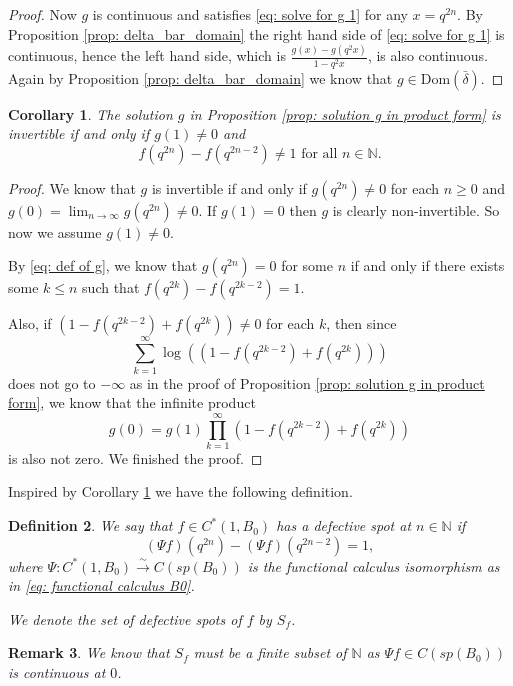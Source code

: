 \documentclass[12pt]{article}
\newtheorem{definition}{Definition}[section]
\newtheorem{remark}[definition]{Remark}
\newtheorem{corollary}[definition]{Corollary}
\numberwithin{equation}{section}
\def\Dom{{\mathrm {Dom}}}
\def\db{\bar{\delta}}
\def\N{{\mathbb N}}
\begin{document}
\begin{proof}
Now $g$ is continuous and satisfies \eqref{eq: solve for g 1} for any $x=q^{2n}$. By Proposition \ref{prop: delta_bar_domain} the right hand side of \eqref{eq: solve for g 1} is continuous, hence the left hand side, which is  $\frac{g(x) - g(q^2x)}{1 - q^2x}$, is also continuous. Again by Proposition \ref{prop: delta_bar_domain} we know that $g\in \Dom(\db)$.
\end{proof}

\begin{corollary}\label{coro: g invertible}
   The solution $g$ in Proposition \ref{prop: solution g in product form} is invertible if and only if $g(1)\neq 0$ and
    \begin{equation}\label{eq: defective spot of f}
    f(q^{2n}) - f(q^{2n - 2}) \neq 1\text{ for all }n \in \N.\end{equation}
\end{corollary}
\begin{proof}
We know that $g$ is invertible if and only if $g(q^{2n})\neq 0$ for each $n\geq 0$ and $g(0)=\lim_{n\to \infty}g(q^{2n})\neq 0$. If $g(1)=0$ then $g$ is clearly non-invertible. So now we assume $g(1)\neq 0$.
    
    By \eqref{eq: def of g}, we know that $g(q^{2n}) = 0$ for some $n$ if and only if there exists some $k \leq n$ such that $f(q^{2k}) - f(q^{2k - 2}) = 1.$ 
    
    Also, if $ (1 - f(q^{2k - 2}) + f(q^{2k})) \neq 0$ for each $k$, then since 
    $$\sum_{k=1}^{\infty}\log((1 - f(q^{2k - 2}) + f(q^{2k})))
    $$ does not go to $-\infty$ as in the proof of Proposition \ref{prop: solution g in product form}, we know that the infinite product
    $$g(0)= g(1)\prod_{k = 1}^\infty (1 - f(q^{2k - 2}) + f(q^{2k}))$$ is also  not zero. We finished the proof.
\end{proof}

Inspired by Corollary \ref{coro: g invertible} we have the following definition.

\begin{definition}\label{def: defective spot}
    We say that $f \in C^*(1, B_0)$ has a \textit{defective spot} at $n \in \N$ if $$(\Psi f)(q^{2n}) - (\Psi f)(q^{2n - 2}) = 1,$$
    where $\Psi: C^*(1, B_0)\overset{\sim}{\to}C(sp(B_0))$ is the functional calculus isomorphism as in \eqref{eq: functional calculus B0}. 

    We denote the set of defective spots of $f$ by $S_f$.
\end{definition}
\begin{remark}\label{rmk: defective spot finite}
We know that $S_f$ must be a finite subset of $\N$ as $\Psi f\in C(sp(B_0))$ is continuous at $0$.
\end{remark}
\end{document}
